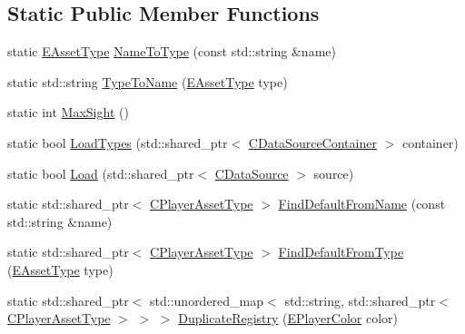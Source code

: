 \subsection*{Static Public Member Functions}
\begin{DoxyCompactItemize}
\item 
static \hyperlink{GameDataTypes_8h_a5600d4fc433b83300308921974477fec}{E\+Asset\+Type} \hyperlink{classCPlayerAssetType_a42d55b6d7606e021c063fce3a14c56de}{Name\+To\+Type} (const std\+::string \&name)
\item 
static std\+::string \hyperlink{classCPlayerAssetType_a66ce89c35b74940e9fc947a1f4b9e770}{Type\+To\+Name} (\hyperlink{GameDataTypes_8h_a5600d4fc433b83300308921974477fec}{E\+Asset\+Type} type)
\item 
static int \hyperlink{classCPlayerAssetType_a1c1648ef0fdd2d112508c2ef9b7b70d1}{Max\+Sight} ()
\item 
static bool \hyperlink{classCPlayerAssetType_ad36348338ae4fea7e70450ef30c92a26}{Load\+Types} (std\+::shared\+\_\+ptr$<$ \hyperlink{classCDataSourceContainer}{C\+Data\+Source\+Container} $>$ container)
\item 
static bool \hyperlink{classCPlayerAssetType_a8e50738b1b451f4c870108777e6e3f90}{Load} (std\+::shared\+\_\+ptr$<$ \hyperlink{classCDataSource}{C\+Data\+Source} $>$ source)
\item 
static std\+::shared\+\_\+ptr$<$ \hyperlink{classCPlayerAssetType}{C\+Player\+Asset\+Type} $>$ \hyperlink{classCPlayerAssetType_a7e1684eac4efaf7afe9a5c15af262b33}{Find\+Default\+From\+Name} (const std\+::string \&name)
\item 
static std\+::shared\+\_\+ptr$<$ \hyperlink{classCPlayerAssetType}{C\+Player\+Asset\+Type} $>$ \hyperlink{classCPlayerAssetType_a7b3c6682f379bfcd974342329eaabab9}{Find\+Default\+From\+Type} (\hyperlink{GameDataTypes_8h_a5600d4fc433b83300308921974477fec}{E\+Asset\+Type} type)
\item 
static std\+::shared\+\_\+ptr$<$ std\+::unordered\+\_\+map$<$ std\+::string, std\+::shared\+\_\+ptr$<$ \hyperlink{classCPlayerAssetType}{C\+Player\+Asset\+Type} $>$ $>$ $>$ \hyperlink{classCPlayerAssetType_a6dfbccbbed7fecec6b7e2c51ac22fe5a}{Duplicate\+Registry} (\hyperlink{GameDataTypes_8h_aafb0ca75933357ff28a6d7efbdd7602f}{E\+Player\+Color} color)
\end{DoxyCompactItemize}
